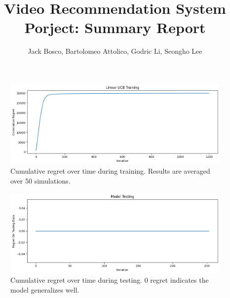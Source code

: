 \documentclass{article}
\title{Video Recommendation System Porject: Summary Report}
\author{Jack Bosco, Bartolomeo Attolico, Godric Li, Seongho Lee}
\begin{document}
\maketitle










\begin{figure}
    \includegraphics[width=\textwidth]{train_plot.png}
    \caption{Cumulative regret over time during training. Results are averaged over 50 simulations.}
    \label{train_plot}
\end{figure}

\begin{figure}
    \includegraphics[width=\textwidth]{test_plot.png}
    \caption{Cumulative regret over time during testing. $0$ regret indicates the model generalizes well.}
    \label{test_plot}
\end{figure}




\end{document}

